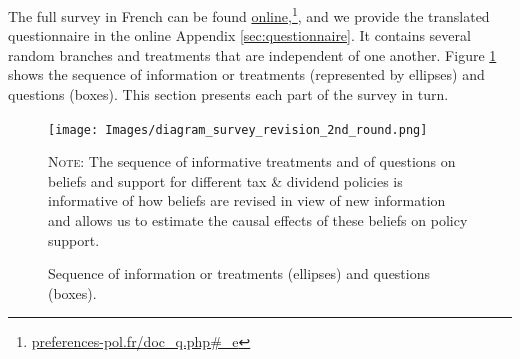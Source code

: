 \documentclass[12pt]{article} %
\begin{document}



The full survey in French can be found \href{http://preferences-pol.fr/doc_q.php#_e}{online},\footnote{\href{http:\/\/preferences-pol.fr\/doc\_q.php\#\_e}{preferences-pol.fr/doc\_q.php\#\_e}}, and we provide the translated questionnaire in the online Appendix \ref{sec:questionnaire}. It contains several random branches and treatments that are independent of one another. Figure \ref{fig:survey} shows the sequence of information or treatments (represented by ellipses) and questions (boxes). This section presents each part of the survey in turn. %

\begin{figure}[ht!]
\centering
\texttt{[image: Images/diagram\_survey\_revision\_2nd\_round.png]}
\parbox[t]{0.89\columnwidth}{
\caption{Sequence of information or treatments (ellipses) and questions (boxes).}
\linespread{1.2}\selectfont \footnotesize{\textsc{Note:} The sequence of informative treatments and of questions on beliefs and support for different tax \& dividend policies is informative of how beliefs are revised in view of new information and allows us to estimate the causal effects of these beliefs on policy support. }\label{fig:survey}} %
\end{figure}

\end{document}
